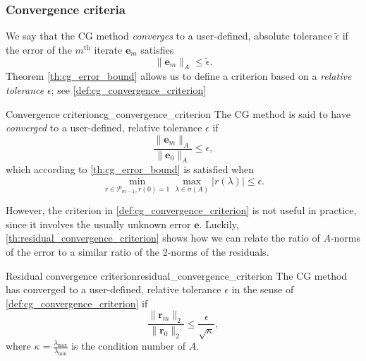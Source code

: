 \subsubsection{Convergence criteria}\label{sec:cg_convergence_criteria}
We say that the CG method \textit{converges} to a user-defined, absolute tolerance $\tilde{\epsilon}$ if the error of the $m^{\text{th}}$ iterate $\mathbf{e}_m$ satisfies
\[
  \|\mathbf{e}_m\|_A \leq \tilde{\epsilon}.
\]
Theorem \ref{th:cg_error_bound} allows us to define a criterion based on a \textit{relative tolerance} $\epsilon$; see \cref{def:cg_convergence_criterion}
\begin{fancydef}{Convergence criterion}{cg_convergence_criterion}
  The CG method is said to have \textit{converged} to a user-defined, relative tolerance $\epsilon$ if
  \begin{equation*}
    \frac{\|\mathbf{e}_m\|_A}{\|\mathbf{e}_0\|_A} \leq \epsilon,
  \end{equation*}
  which according to \cref{th:cg_error_bound} is satisfied when
  \begin{equation}
    \min_{r \in \mathcal{P}_{m-1}, r(0) = 1} \max_{\lambda \in \sigma(A)} |r(\lambda)| \leq \epsilon.
    \label{eq:cg_convergence_criterion}
  \end{equation}
\end{fancydef}
However, the criterion in \cref{def:cg_convergence_criterion} is not useful in practice, since it involves the usually unknown error $\mathbf{e}$. Luckily, \cref{th:residual_convergence_criterion} shows how we can relate the ratio of $A$-norms of the error to a similar ratio of the 2-norms of the residuals.
\begin{fancyth}{Residual convergence criterion}{residual_convergence_criterion}
  The CG method has converged to a user-defined, relative tolerance $\epsilon$ in the sense of \cref{def:cg_convergence_criterion} if
  \begin{equation}
    \frac{\|\mathbf{r}_m\|_2}{\|\mathbf{r}_0\|_2} \leq \frac{\epsilon}{\sqrt{\kappa}},
    \label{eq:residual_convergence_criterion}
  \end{equation}
  where $\kappa = \frac{\lambda_{\text{max}}}{\lambda_{\text{min}}}$ is the condition number of $A$.
\end{fancyth}
